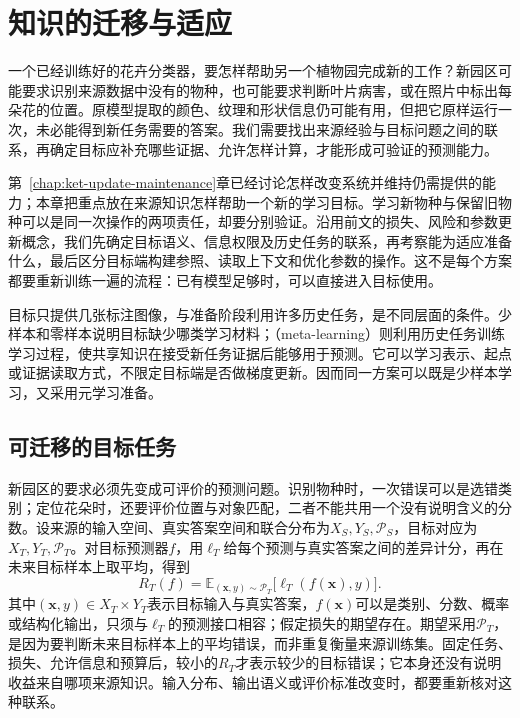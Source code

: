 \chapter{知识的迁移与适应}
\label{chap:ket-transfer-adaptation}

一个已经训练好的花卉分类器，要怎样帮助另一个植物园完成新的工作？新园区可能要求识别来源数据中没有的物种，也可能要求判断叶片病害，或在照片中标出每朵花的位置。原模型提取的颜色、纹理和形状信息仍可能有用，但把它原样运行一次，未必能得到新任务需要的答案。我们需要找出来源经验与目标问题之间的联系，再确定目标应补充哪些证据、允许怎样计算，才能形成可验证的预测能力。

第~\ref{chap:ket-update-maintenance}章已经讨论怎样改变系统并维持仍需提供的能力；本章把重点放在来源知识怎样帮助一个新的学习目标。学习新物种与保留旧物种可以是同一次操作的两项责任，却要分别验证。沿用前文的损失、风险和参数更新概念，我们先确定目标语义、信息权限及历史任务的联系，再考察能为适应准备什么，最后区分目标端构建参照、读取上下文和优化参数的操作。这不是每个方案都要重新训练一遍的流程：已有模型足够时，可以直接进入目标使用。

目标只提供几张标注图像，与准备阶段利用许多历史任务，是不同层面的条件。少样本和零样本说明目标缺少哪类学习材料；（meta-learning）则利用历史任务训练学习过程，使共享知识在接受新任务证据后能够用于预测。它可以学习表示、起点或证据读取方式，不限定目标端是否做梯度更新。因而同一方案可以既是少样本学习，又采用元学习准备。

\section{可迁移的目标任务}
\label{sec:ket-transfer-targets}

新园区的要求必须先变成可评价的预测问题。识别物种时，一次错误可以是选错类别；定位花朵时，还要评价位置与对象匹配，二者不能共用一个没有说明含义的分数。设来源的输入空间、真实答案空间和联合分布为$X_S,Y_S,\mathcal P_S$，目标对应为$X_T,Y_T,\mathcal P_T$。对目标预测器$f$，用$\ell_T$给每个预测与真实答案之间的差异计分，再在未来目标样本上取平均，得到
\begin{equation}
  R_T(f)=\mathbb E_{(\bm{x},y)\sim\mathcal P_T}
  \bigl[\ell_T(f(\bm{x}),y)\bigr].
  \label{eq:ket-transfer-target-risk}
\end{equation}
其中$(\bm x,y)\in X_T\times Y_T$表示目标输入与真实答案，$f(\bm x)$可以是类别、分数、概率或结构化输出，只须与$\ell_T$的预测接口相容；假定损失的期望存在。期望采用$\mathcal P_T$，是因为要判断未来目标样本上的平均错误，而非重复衡量来源训练集。固定任务、损失、允许信息和预算后，较小的$R_T$才表示较少的目标错误；它本身还没有说明收益来自哪项来源知识。输入分布、输出语义或评价标准改变时，都要重新核对这种联系。

